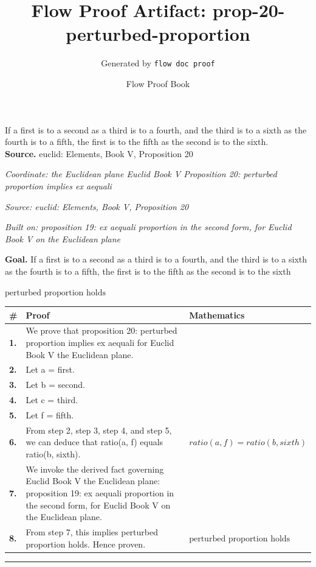 \documentclass[11pt]{article}
\title{Flow Proof Artifact: prop-20-perturbed-proportion}
\author{Generated by \texttt{flow doc proof}}
\date{Flow Proof Book}
\theoremstyle{definition}
\begin{document}
\maketitle
If a first is to a second as a third is to a fourth, and the third is to a sixth as the fourth is to a fifth, the first is to the fifth as the second is to the sixth.\\[0.5em]
\textbf{Source.} euclid: Elements, Book V, Proposition 20\\[0.5em]
\bigskip
{}\par
\smallskip\noindent\textit{Coordinate: the Euclidean plane \cdot Euclid Book V \cdot Proposition 20: perturbed proportion implies ex aequali}\par
\smallskip\noindent\textit{Source: euclid: Elements, Book V, Proposition 20}\par
\smallskip\noindent\textit{Built on: proposition 19: ex aequali proportion in the second form, for Euclid Book V on the Euclidean plane}\par
\medskip
\noindent\textbf{Goal.} If a first is to a second as a third is to a fourth, and the third is to a sixth as the fourth is to a fifth, the first is to the fifth as the second is to the sixth\par
\noindent$\displaystyle \text{perturbed proportion holds}$\par
\medskip
\noindent
\begin{tabular}{@{} >{\raggedright\arraybackslash}p{} >{\raggedright\arraybackslash}p{} >{\raggedleft\arraybackslash}p{} @{}}
\textbf{\#} & \textbf{Proof} & \textbf{Mathematics} \\
\midrule
\textbf{1.} & We prove that proposition 20: perturbed proportion implies ex aequali for Euclid Book V the Euclidean plane. & \\[0.45em]
\textbf{2.} & Let a = first. & \\[0.45em]
\textbf{3.} & Let b = second. & \\[0.45em]
\textbf{4.} & Let c = third. & \\[0.45em]
\textbf{5.} & Let f = fifth. & \\[0.45em]
\textbf{6.} & From step 2, step 3, step 4, and step 5, we can deduce that ratio(a, f) equals ratio(b, sixth). & $\displaystyle ratio(a, f) = ratio(b, sixth)$ \\[0.45em]
\textbf{7.} & We invoke the derived fact governing Euclid Book V the Euclidean plane: proposition 19: ex aequali proportion in the second form, for Euclid Book V on the Euclidean plane. & \\[0.45em]
\textbf{8.} & From step 7, this implies perturbed proportion holds. Hence proven. & $\displaystyle \text{perturbed proportion holds}$ \\[0.45em]
\bottomrule
\end{tabular}
\label{thm:Geometry-Euclid Book V-proposition_20_perturbed_proportion_implies_ex_aequali}
\par\medskip\hrule
\end{document}
